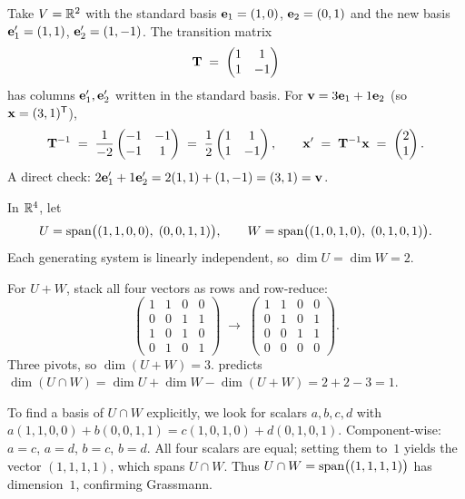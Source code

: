 \begin{example}
\label{ex:change-of-basis-numeric}
Take $V = \mathbb{R}^2$ with the standard basis $\mathbf{e}_1 = (1, 0)$,
$\mathbf{e}_2 = (0, 1)$ and the new basis
$\mathbf{e}'_1 = (1, 1)$, $\mathbf{e}'_2 = (1, -1)$. The transition matrix
\[
  \mathbf{T} \;=\; \begin{pmatrix} 1 & 1 \\ 1 & -1 \end{pmatrix}
\]
has columns $\mathbf{e}'_1, \mathbf{e}'_2$ written in the standard basis.
For $\mathbf{v} = 3\mathbf{e}_1 + 1\mathbf{e}_2$ (so $\mathbf{x} = (3, 1)^{\mathsf{T}}$),
\[
  \mathbf{T}^{-1} \;=\; \frac{1}{-2}\begin{pmatrix} -1 & -1 \\ -1 & 1 \end{pmatrix}
  \;=\; \frac{1}{2}\begin{pmatrix} 1 & 1 \\ 1 & -1 \end{pmatrix},
  \qquad
  \mathbf{x}' \;=\; \mathbf{T}^{-1}\mathbf{x} \;=\; \begin{pmatrix} 2 \\ 1 \end{pmatrix}.
\]
A direct check: $2\mathbf{e}'_1 + 1\mathbf{e}'_2 = 2(1,1) + (1,-1) = (3, 1) = \mathbf{v}$.
\end{example}

\begin{example}
\label{ex:grassmann-numeric}
In $\mathbb{R}^4$, let
\[
  U = \operatorname{span}\bigl((1, 1, 0, 0),\; (0, 0, 1, 1)\bigr), \qquad
  W = \operatorname{span}\bigl((1, 0, 1, 0),\; (0, 1, 0, 1)\bigr).
\]
Each generating system is linearly independent, so $\dim U = \dim W = 2$.

For $U + W$, stack all four vectors as rows and row-reduce:
\[
  \begin{pmatrix}
    1 & 1 & 0 & 0 \\
    0 & 0 & 1 & 1 \\
    1 & 0 & 1 & 0 \\
    0 & 1 & 0 & 1
  \end{pmatrix}
  \;\longrightarrow\;
  \begin{pmatrix}
    1 & 1 & 0 & 0 \\
    0 & 1 & 0 & 1 \\
    0 & 0 & 1 & 1 \\
    0 & 0 & 0 & 0
  \end{pmatrix}.
\]
Three pivots, so $\dim(U + W) = 3$.  predicts
$\dim(U \cap W) = \dim U + \dim W - \dim(U + W) = 2 + 2 - 3 = 1$.

To find a basis of $U \cap W$ explicitly, we look for scalars
$a, b, c, d$ with $a(1,1,0,0) + b(0,0,1,1) = c(1,0,1,0) + d(0,1,0,1)$.
Component-wise: $a = c$, $a = d$, $b = c$, $b = d$. All four scalars
are equal; setting them to~$1$ yields the vector $(1, 1, 1, 1)$, which
spans $U \cap W$. Thus $U \cap W = \operatorname{span}\bigl((1, 1, 1, 1)\bigr)$ has
dimension~$1$, confirming Grassmann.
\end{example}

